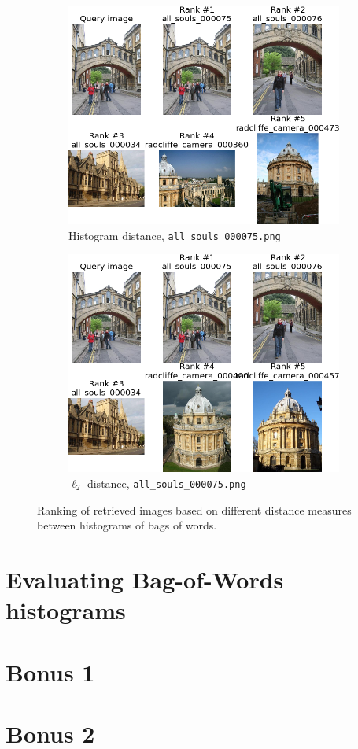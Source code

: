 \documentclass[a4paper,10pt]{article}
\begin{document}
\begin{figure}
\begin{subfigure}{0.47\textwidth}
    \includegraphics[width=\textwidth]{ranking_h_75.png}
    \caption{Histogram distance, \texttt{all\_souls\_000075.png}}
  \end{subfigure}
  \hspace*{\fill}
  \begin{subfigure}{0.47\textwidth}
    \centering
    \includegraphics[width=\textwidth]{ranking_l_75.png}
    \caption{$\ell_2$ distance, \texttt{all\_souls\_000075.png}}
  \end{subfigure}
  \caption{Ranking of retrieved images based on different distance measures between histograms of bags of words.}
  \label{fig:bow_retrieval}
\end{figure}

\section{Evaluating Bag-of-Words histograms}

\section{Bonus 1}

\section{Bonus 2}
\end{document}
